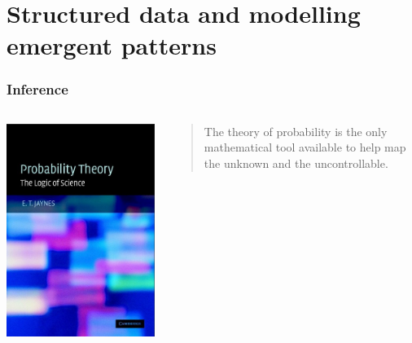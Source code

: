 \documentclass{beamer}
\begin{document}
\section{Structured data and modelling emergent patterns}

\begin{frame}
  \frametitle{Inference}
  \begin{columns}
    \begin{column}{0.45\textwidth}
      \begin{center}
        \includegraphics[width = \textwidth,height = 0.8\textheight,keepaspectratio = true]{figure/jaynes_theory}
      \end{center}
    \end{column}
    \begin{column}{0.55\textwidth}
      \begin{quote}
        The theory of probability is the only mathematical tool available to help map the unknown and the uncontrollable.
      \end{quote}
    \end{column}
  \end{columns}
\end{frame}
\end{document}
